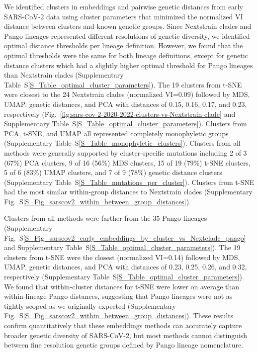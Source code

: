 \documentclass[webpdf,contemporary,large,single]{oup-authoring-template}%
\theoremstyle{thmstyleone}%
\theoremstyle{thmstyletwo}%
\theoremstyle{thmstylethree}%
\begin{document}
We identified clusters in embeddings and pairwise genetic distances from early SARS-CoV-2 data using cluster parameters that minimized the normalized VI distance between clusters and known genetic groups.
Since Nextstrain clades and Pango lineages represented different resolutions of genetic diversity, we identified optimal distance thresholds per lineage definition.
However, we found that the optimal thresholds were the same for both lineage definitions, except for genetic distance clusters which had a slightly higher optimal threshold for Pango lineages than Nextstrain clades (Supplementary Table~S\ref{S_Table_optimal_cluster_parameters}).
The 19 clusters from t-SNE were closest to the 24 Nextstrain clades (normalized VI=0.09) followed by MDS, UMAP, genetic distances, and PCA with distances of 0.15, 0.16, 0.17, and 0.23, respectively (Fig.~\ref{fig:sars-cov-2-2020-2022-clusters-vs-Nextstrain-clade} and Supplementary Table~S\ref{S_Table_optimal_cluster_parameters}).
Clusters from PCA, t-SNE, and UMAP all represented completely monophyletic groups (Supplementary Table~S\ref{S_Table_monophyletic_clusters}).
Clusters from all methods were generally supported by cluster-specific mutations including 2 of 3 (67\%) PCA clusters, 9 of 16 (56\%) MDS clusters, 15 of 19 (79\%) t-SNE clusters, 5 of 6 (83\%) UMAP clusters, and 7 of 9 (78\%) genetic distance clusters (Supplementary Table~S\ref{S_Table_mutations_per_cluster}).
Clusters from t-SNE had the most similar within-group distances to Nextstrain clades (Supplementary Fig.~S\ref{S_Fig_sarscov2_within_between_group_distances}).

Clusters from all methods were farther from the 35 Pango lineages (Supplementary Fig.~S\ref{S_Fig_sarscov2_early_embeddings_by_cluster_vs_Nextclade_pango} and Supplementary Table~S\ref{S_Table_optimal_cluster_parameters}).
The 19 clusters from t-SNE were the closest (normalized VI=0.14) followed by MDS, UMAP, genetic distances, and PCA with distances of 0.23, 0.25, 0.26, and 0.32, respectively (Supplementary Table~S\ref{S_Table_optimal_cluster_parameters}).
We found that within-cluster distances for t-SNE were lower on average than within-lineage Pango distances, suggesting that Pango lineages were not as tightly scoped as we originally expected (Supplementary Fig.~S\ref{S_Fig_sarscov2_within_between_group_distances}).
These results confirm quantitatively that these embeddings methods can accurately capture broader genetic diversity of SARS-CoV-2, but most methods cannot distinguish between fine resolution genetic groups defined by Pango lineage nomenclature.
\end{document}
